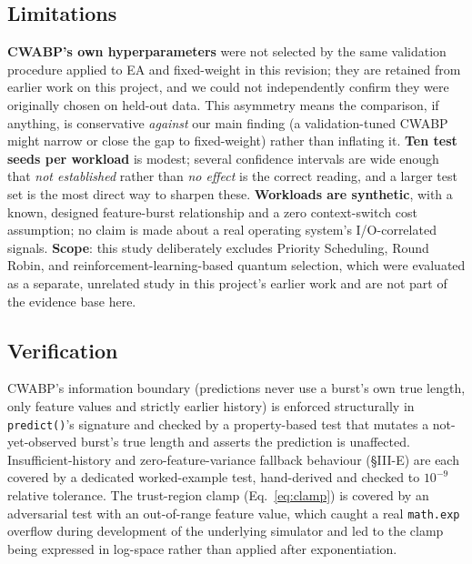\documentclass[10pt,twocolumn]{article}
\begin{document}
\subsection{Limitations}
\textbf{CWABP's own hyperparameters} were not selected by the same validation procedure applied to EA and fixed-weight in this revision; they are retained from earlier work on this project, and we could not independently confirm they were originally chosen on held-out data. This asymmetry means the comparison, if anything, is conservative \emph{against} our main finding (a validation-tuned CWABP might narrow or close the gap to fixed-weight) rather than inflating it. \textbf{Ten test seeds per workload} is modest; several confidence intervals are wide enough that \emph{not established} rather than \emph{no effect} is the correct reading, and a larger test set is the most direct way to sharpen these. \textbf{Workloads are synthetic}, with a known, designed feature-burst relationship and a zero context-switch cost assumption; no claim is made about a real operating system's I/O-correlated signals. \textbf{Scope}: this study deliberately excludes Priority Scheduling, Round Robin, and reinforcement-learning-based quantum selection, which were evaluated as a separate, unrelated study in this project's earlier work and are not part of the evidence base here.

\subsection{Verification}
CWABP's information boundary (predictions never use a burst's own true length, only feature values and strictly earlier history) is enforced structurally in \texttt{predict()}'s signature and checked by a property-based test that mutates a not-yet-observed burst's true length and asserts the prediction is unaffected. Insufficient-history and zero-feature-variance fallback behaviour (\S III-E) are each covered by a dedicated worked-example test, hand-derived and checked to $10^{-9}$ relative tolerance. The trust-region clamp (Eq.~\ref{eq:clamp}) is covered by an adversarial test with an out-of-range feature value, which caught a real \texttt{math.exp} overflow during development of the underlying simulator and led to the clamp being expressed in log-space rather than applied after exponentiation.
\end{document}
